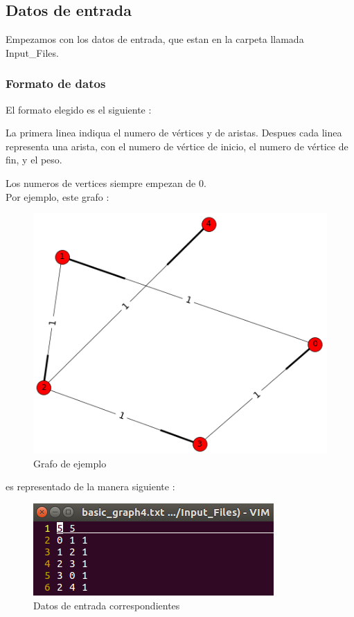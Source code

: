 \documentclass[a4paper,11pt]{article}
\begin{document}
\subsection{Datos de entrada}

Empezamos con los datos de entrada, que estan en la carpeta llamada Input\_Files.

\subsubsection{Formato de datos}

El formato elegido es el siguiente :

La primera linea indiqua el numero de vértices y de aristas.
Despues cada linea representa una arista, con el numero de vértice de inicio, el numero de vértice de fin, y el peso.

Los numeros de vertices siempre empezan de 0.\\

\noindent Por ejemplo, este grafo :

\begin{figure}[h]
\begin{center}
  \includegraphics[scale=0.7]{input_exemple.png}
  \caption{Grafo de ejemplo}
\end{center}
\end{figure}

\noindent es representado de la manera siguiente :

\begin{figure}[h]
\begin{center}
  \includegraphics[scale=0.7]{input_graph4.png}
  \caption{Datos de entrada correspondientes}
\end{center}
\end{figure}
\end{document}
